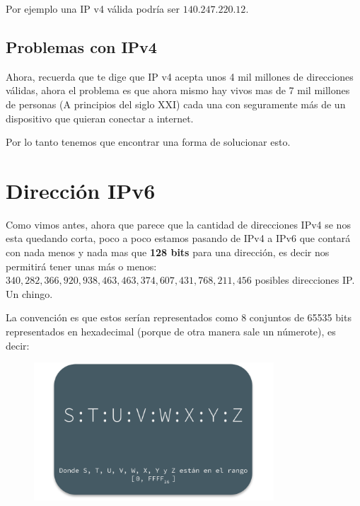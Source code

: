 \documentclass[12pt, fleqn]{report}                             %
\theoremstyle{break}                                            %
\begin{document}
            Por ejemplo una IP v4 válida podría ser $140.247.220.12$. 


            \vspace{1.5em}
            \subsection{Problemas con IPv4}

                Ahora, recuerda que te dige que IP v4 acepta unos 4 mil millones de direcciones
                válidas, ahora el problema es que ahora mismo hay vivos mas de 7 mil millones
                de personas (A principios del siglo XXI) cada una con seguramente más de un
                dispositivo que quieran conectar a internet.

                Por lo tanto tenemos que encontrar una forma de solucionar esto.



        \clearpage
        \section{Dirección IPv6}

            Como vimos antes, ahora que parece que la cantidad de direcciones IPv4 se 
            nos esta quedando corta, poco a poco estamos pasando de IPv4 a IPv6 que contará
            con nada menos y nada mas que \textbf{128 bits} para una dirección, es decir
            nos permitirá tener unas más o menos: $340, 282, 366, 920, 938, 463, 463, 374, 607,
            431, 768, 211, 456$ posibles direcciones IP. Un chingo.

            La convención es que estos serían representados como 8 conjuntos de 65535 bits representados
            en hexadecimal (porque de otra manera sale un númerote), es decir:

            \begin{figure}[h]
                \centering
                \includegraphics[width=0.80\textwidth]{IPv6}
            \end{figure}
\end{document}
